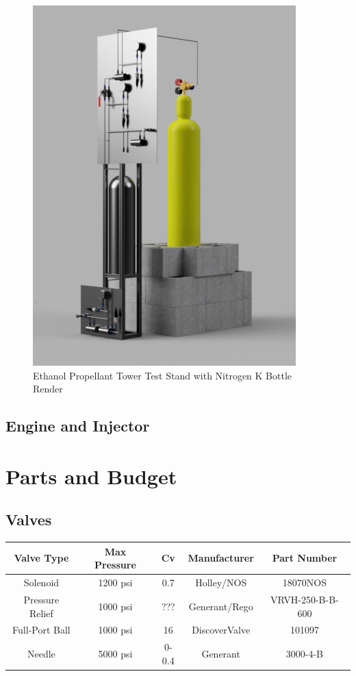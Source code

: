 \documentclass[9pt]{article} %
\numberwithin{equation}{section} %
\begin{document}
\begin{figure}[!htb] 
    \centering
    \includegraphics[scale=2]{master_stand_overall_render_2.png} %
    \caption{Ethanol Propellant Tower Test Stand with Nitrogen K Bottle Render}
    \label{fig:ethanol_tank_stand_with_nitrogen_render}
\end{figure}

\subsection{Engine and Injector}

\section{Parts and Budget}

\subsection{Valves}
\begin{center}
 \begin{tabular}{|c c c c c|} 
 \hline
 Valve Type & Max Pressure & Cv & Manufacturer & Part Number\\
 \hline\hline
 Solenoid & 1200 psi & 0.7 & Holley/NOS & 18070NOS\\ 
 \hline
 Pressure Relief & 1000 psi & ??? & Generant/Rego & VRVH-250-B-B-600\\
 \hline
 Full-Port Ball & 1000 psi & 16 & DiscoverValve & 101097	\\
 \hline
 Needle & 5000 psi & 0-0.4 & Generant & 3000-4-B\\ 
 \hline
\end{tabular}
\end{center}
\end{document}
